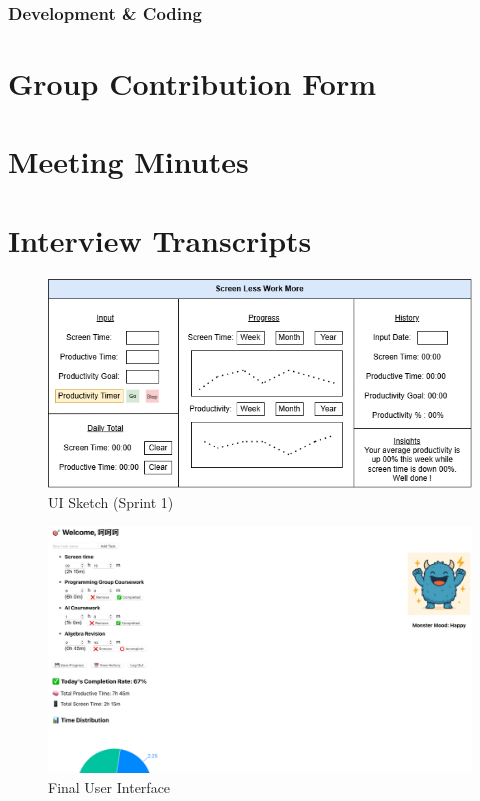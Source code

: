 \documentclass[12pt,a4paper]{article}
\begin{document}
\subsubsection{Development & Coding}

\section{Group Contribution Form}

\section{Meeting Minutes}

\section{Interview Transcripts}

\begin{figure}
    \centering
    \includegraphics[width=\linewidth]{UI Diagram 1.png}
    \caption{UI Sketch (Sprint 1)}
    \label{fig:uml-diagram}
\end{figure}

\begin{figure}
    \centering
    \includegraphics[width=\linewidth]{UI Sprint 2.png}
    \caption{Final User Interface}
    \label{fig:uml-diagram}
\end{figure}
\end{document}
